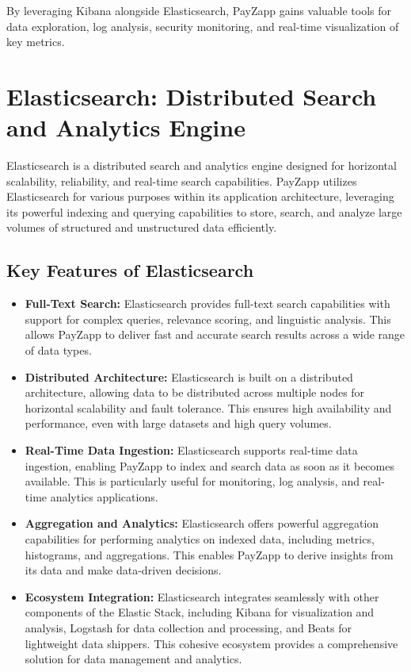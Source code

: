 \documentclass[12pt,a4paper]{report}
\begin{document}
By leveraging Kibana alongside Elasticsearch, PayZapp gains valuable tools for data exploration, log analysis, security monitoring, and real-time visualization of key metrics.

\section{Elasticsearch: Distributed Search and Analytics Engine}

Elasticsearch is a distributed search and analytics engine designed for horizontal scalability, reliability, and real-time search capabilities. PayZapp utilizes Elasticsearch for various purposes within its application architecture, leveraging its powerful indexing and querying capabilities to store, search, and analyze large volumes of structured and unstructured data efficiently.

\subsection{Key Features of Elasticsearch}

\begin{itemize}
    \item \textbf{Full-Text Search:} Elasticsearch provides full-text search capabilities with support for complex queries, relevance scoring, and linguistic analysis. This allows PayZapp to deliver fast and accurate search results across a wide range of data types.
    
    \item \textbf{Distributed Architecture:} Elasticsearch is built on a distributed architecture, allowing data to be distributed across multiple nodes for horizontal scalability and fault tolerance. This ensures high availability and performance, even with large datasets and high query volumes.
    
    \item \textbf{Real-Time Data Ingestion:} Elasticsearch supports real-time data ingestion, enabling PayZapp to index and search data as soon as it becomes available. This is particularly useful for monitoring, log analysis, and real-time analytics applications.
    
    \item \textbf{Aggregation and Analytics:} Elasticsearch offers powerful aggregation capabilities for performing analytics on indexed data, including metrics, histograms, and aggregations. This enables PayZapp to derive insights from its data and make data-driven decisions.
    
    \item \textbf{Ecosystem Integration:} Elasticsearch integrates seamlessly with other components of the Elastic Stack, including Kibana for visualization and analysis, Logstash for data collection and processing, and Beats for lightweight data shippers. This cohesive ecosystem provides a comprehensive solution for data management and analytics.
\end{itemize}
\end{document}

